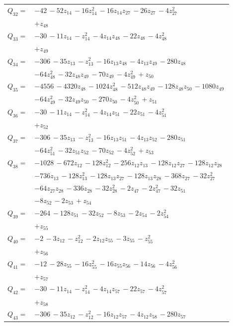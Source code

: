 \begin{longtable}{@{}r p{0.88\linewidth}@{}}
$Q_{32}=$ & $-42\,-52z_{14}\,-16z_{14}^{2}\,-16z_{14}z_{27}\,-26z_{27}\,-4z_{27}^{2}$\\
 & $+z_{48}$\\[5pt]
$Q_{33}=$ & $-30\,-11z_{14}\,-z_{14}^{2}\,-4z_{14}z_{48}\,-22z_{48}\,-4z_{48}^{2}$\\
 & $+z_{49}$\\[5pt]
$Q_{34}=$ & $-306\,-35z_{13}\,-z_{13}^{2}\,-16z_{13}z_{48}\,-4z_{13}z_{49}\,-280z_{48}$\\
 & $-64z_{48}^{2}\,-32z_{48}z_{49}\,-70z_{49}\,-4z_{49}^{2}\,+z_{50}$\\[5pt]
$Q_{35}=$ & $-4556\,-4320z_{48}\,-1024z_{48}^{2}\,-512z_{48}z_{49}\,-128z_{48}z_{50}\,-1080z_{49}$\\
 & $-64z_{49}^{2}\,-32z_{49}z_{50}\,-270z_{50}\,-4z_{50}^{2}\,+z_{51}$\\[5pt]
$Q_{36}=$ & $-30\,-11z_{14}\,-z_{14}^{2}\,-4z_{14}z_{51}\,-22z_{51}\,-4z_{51}^{2}$\\
 & $+z_{52}$\\[5pt]
$Q_{37}=$ & $-306\,-35z_{13}\,-z_{13}^{2}\,-16z_{13}z_{51}\,-4z_{13}z_{52}\,-280z_{51}$\\
 & $-64z_{51}^{2}\,-32z_{51}z_{52}\,-70z_{52}\,-4z_{52}^{2}\,+z_{53}$\\[5pt]
$Q_{38}=$ & $-1028\,-672z_{12}\,-128z_{12}^{2}\,-256z_{12}z_{13}\,-128z_{12}z_{27}\,-128z_{12}z_{28}$\\
 & $-736z_{13}\,-128z_{13}^{2}\,-128z_{13}z_{27}\,-128z_{13}z_{28}\,-368z_{27}\,-32z_{27}^{2}$\\
 & $-64z_{27}z_{28}\,-336z_{28}\,-32z_{28}^{2}\,-2z_{47}\,-2z_{47}^{2}\,-32z_{51}$\\
 & $-8z_{52}\,-2z_{53}\,+z_{54}$\\[5pt]
$Q_{39}=$ & $-264\,-128z_{51}\,-32z_{52}\,-8z_{53}\,-2z_{54}\,-2z_{54}^{2}$\\
 & $+z_{55}$\\[5pt]
$Q_{40}=$ & $-2\,-3z_{12}\,-z_{12}^{2}\,-2z_{12}z_{55}\,-3z_{55}\,-z_{55}^{2}$\\
 & $+z_{56}$\\[5pt]
$Q_{41}=$ & $-12\,-28z_{55}\,-16z_{55}^{2}\,-16z_{55}z_{56}\,-14z_{56}\,-4z_{56}^{2}$\\
 & $+z_{57}$\\[5pt]
$Q_{42}=$ & $-30\,-11z_{14}\,-z_{14}^{2}\,-4z_{14}z_{57}\,-22z_{57}\,-4z_{57}^{2}$\\
 & $+z_{58}$\\[5pt]
$Q_{43}=$ & $-306\,-35z_{12}\,-z_{12}^{2}\,-16z_{12}z_{57}\,-4z_{12}z_{58}\,-280z_{57}$\\

\end{longtable}
